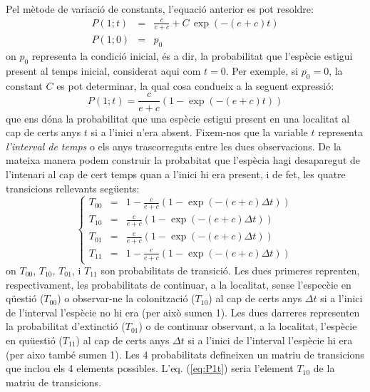 \documentclass{article}
\begin{document}
Pel m\`etode de variaci\'o de constants, l'equaci\'o anterior es pot resoldre: 
\begin{eqnarray}
  P(1;t) & = & \frac{c}{e+c}+C\,\exp(-(e+c)t)\\
  P(1;0) & = & p_{0}\nonumber 
\end{eqnarray}
on $p_0$ representa la condici\'o inicial, \'es a dir, la probabilitat que l'esp\`ecie estigui present al temps inicial, considerat aqui com $t=0$. Per exemple, si $p_0 = 0$, la constant $C$ es pot determinar, la qual cosa condueix a la seguent expressi\'o: 
\begin{equation}
  P(1;t)=\frac{c}{e+c}(1-\exp(-(e+c)t))\label{t_10}
  \label{eq:P1t}
\end{equation}
que ens d\'ona la probabilitat que una esp\`ecie estigui present en una localitat al cap de certs anys $t$ si a l'inici n'era absent. Fixem-nos que la variable $t$ representa {\it l'interval de temps} o els anys trascorreguts entre les dues observacions. De la mateixa manera podem construir la probabitat que l'esp\`ecia hagi desaparegut de l'intenari al cap de cert temps quan a l'inici hi era present, i de fet, les quatre transicions rellevants seg\"uents: 
\begin{equation}
  \label{T_00}
  \left\{
    \begin{array}{ccc}      
      T_{00} &=&  1 - \frac{c}{e+c} ( 1 - \exp(-(e+c)\Delta t))\\
      
      T_{10} &=&  \frac{c}{e+c} ( 1 - \exp(-(e+c)\Delta t) )\\  
      
      T_{01} &=&  \frac{e}{e+c} ( 1 - \exp(-(e+c)\Delta t) ) \\
      
      T_{11} &=&  1 - \frac{e}{e+c} ( 1 - \exp(-(e+c)\Delta t)) 
    \end{array}
  \right.
  \label{eq:matriu}
\end{equation}
on $T_{00}$, $T_{10}$, $T_{01}$, i $T_{11}$ son probabilitats de transici\'o. Les dues primeres reprenten, respectivament, les probabilitats de continuar, a la localitat, sense l'espec\`cie en q\"uesti\'o ($T_{00}$) o observar-ne la colonitzaci\'o ($T_{10}$) al cap de certs anys $\Delta t$ si a l'inici de l'interval l'esp\`ecie no hi era (per aix\`o sumen 1). Les dues darreres representen la probabilitat d'extincti\'o ($T_{01}$) o de continuar observant, a la localitat, l'esp\`ecie en qu\"uesti\'o ($T_{11}$) al cap de certs anys $\Delta t$ si a l'inici de l'interval l'esp\`ecie hi era (per aixo tamb\'e sumen 1). Les 4 probabilitats defineixen un matriu de transicions que inclou els 4 elements possibles. L'eq. (\ref{eq:P1t}) seria l'element $T_{10}$ de la matriu de transicions. 
\smallskip
\end{document}
